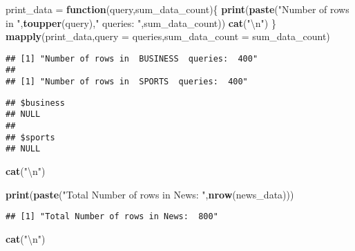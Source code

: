 \documentclass[]{article}
\newenvironment{Shaded}{\begin{snugshade}}{\end{snugshade}}
\newcommand{\KeywordTok}[1]{\textcolor[rgb]{0.13,0.29,0.53}{\textbf{#1}}}
\newcommand{\DataTypeTok}[1]{\textcolor[rgb]{0.13,0.29,0.53}{#1}}
\newcommand{\CharTok}[1]{\textcolor[rgb]{0.31,0.60,0.02}{#1}}
\newcommand{\StringTok}[1]{\textcolor[rgb]{0.31,0.60,0.02}{#1}}
\newcommand{\ControlFlowTok}[1]{\textcolor[rgb]{0.13,0.29,0.53}{\textbf{#1}}}
\newcommand{\NormalTok}[1]{#1}
\begin{document}
\newpage

\begin{Shaded}
\begin{Highlighting}[]
\NormalTok{print_data =}\StringTok{ }\ControlFlowTok{function}\NormalTok{(query,sum_data_count)\{}
  \KeywordTok{print}\NormalTok{(}\KeywordTok{paste}\NormalTok{(}\StringTok{"Number of rows in "}\NormalTok{,}\KeywordTok{toupper}\NormalTok{(query),}\StringTok{" queries: "}\NormalTok{,sum_data_count))}
  \KeywordTok{cat}\NormalTok{(}\StringTok{"}\CharTok{\textbackslash{}n}\StringTok{"}\NormalTok{)}
\NormalTok{\}}
\KeywordTok{mapply}\NormalTok{(print_data,}\DataTypeTok{query =}\NormalTok{ queries,}\DataTypeTok{sum_data_count =}\NormalTok{ sum_data_count)}
\end{Highlighting}
\end{Shaded}

\begin{verbatim}
## [1] "Number of rows in  BUSINESS  queries:  400"
## 
## [1] "Number of rows in  SPORTS  queries:  400"
\end{verbatim}

\begin{verbatim}
## $business
## NULL
## 
## $sports
## NULL
\end{verbatim}

\begin{Shaded}
\begin{Highlighting}[]
\KeywordTok{cat}\NormalTok{(}\StringTok{"}\CharTok{\textbackslash{}n}\StringTok{"}\NormalTok{)}
\end{Highlighting}
\end{Shaded}

\begin{Shaded}
\begin{Highlighting}[]
\KeywordTok{print}\NormalTok{(}\KeywordTok{paste}\NormalTok{(}\StringTok{"Total Number of rows in News: "}\NormalTok{,}\KeywordTok{nrow}\NormalTok{(news_data)))}
\end{Highlighting}
\end{Shaded}

\begin{verbatim}
## [1] "Total Number of rows in News:  800"
\end{verbatim}

\begin{Shaded}
\begin{Highlighting}[]
\KeywordTok{cat}\NormalTok{(}\StringTok{"}\CharTok{\textbackslash{}n}\StringTok{"}\NormalTok{)}
\end{Highlighting}
\end{Shaded}
\end{document}
